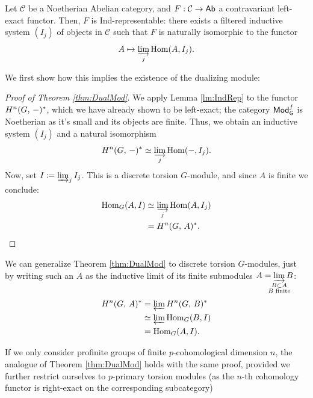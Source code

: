 \documentclass[a4paper, oneside]{memoir}
\begin{document}
\begin{lemma}\label{lm:IndRep}
    Let \(\mathcal{C}\) be a Noetherian Abelian category, and \(F: \mathcal{C}\to\mathsf{Ab}\) a contravariant left-exact functor.
    Then, \(F\) is \textup{Ind}-representable: there exists a filtered inductive system \((I_j)\) of objects in \(\mathcal{C}\) such that \(F\) is naturally isomorphic to the functor
    \[A\mapsto \varinjlim_j \operatorname{Hom}(A, I_j).\]
\end{lemma}

We first show how this implies the existence of the dualizing module:
\begin{proof}[Proof of Theorem \ref{thm:DualMod}]
    We apply Lemma \ref{lm:IndRep} to the functor \(H^{n}( G, \, - )^*\), which we have already shown to be left-exact; the category \(\mathsf{Mod}_{\mathsf{G}}^f\) is Noetherian as it's small and its objects are finite.
    Thus, we obtain an inductive system \((I_j)\) and a natural isomorphism
    \[
        H^{n}( G, \, - )^* \simeq \varinjlim_j \operatorname{Hom}(-,I_j).
    \]
    Now, set \(I\coloneqq \varinjlim_j I_j\). This is a discrete torsion \(G\)-module, and since \(A\) is finite we conclude:
    \begin{align*}
        \operatorname{Hom}_G(A,I) & \simeq \varinjlim_j \operatorname{Hom}(A,I_j) \\
                    & = H^{n}( G, \, A )^*.
    \end{align*}
\end{proof}

\begin{remark}\label{rm:Torsion}
    We can generalize Theorem \ref{thm:DualMod} to discrete torsion \(G\)-modules, just by writing such an \(A\) as the inductive limit of its finite submodules \(A=\displaystyle\varinjlim_{\mathclap{\substack{B\subset A \\B\text{ finite}}}}{B}\):
    \begin{align*}
        H^{n}( G, \, A )^* & =\varprojlim H^{n}( G, \, B )^*     \\
                      & \simeq \varprojlim \operatorname{Hom}_G(B,I) \\
                      & = \operatorname{Hom}_G(A,I).
    \end{align*}
\end{remark}
\begin{remark}\label{rm:pTorsion}
    If we only consider profinite groups of finite \(p\)-cohomological dimension \(n\), the analogue of Theorem \ref{thm:DualMod} holds with the same proof, provided we further restrict ourselves to \(p\)-primary torsion modules (as the \(n\)-th cohomology functor is right-exact on the corresponding subcategory)
\end{remark}
\end{document}
